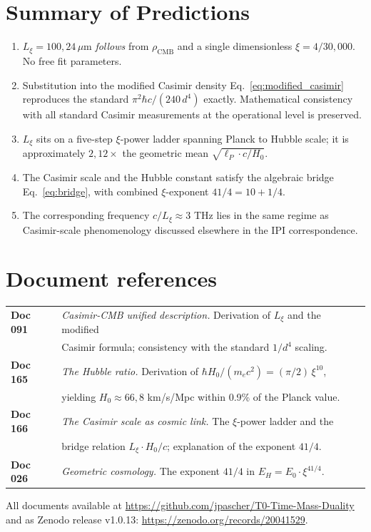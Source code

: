 \documentclass[11pt,a4paper]{article}
\begin{document}
\section{Summary of Predictions}

\begin{enumerate}\itemsep2pt
\item $L_\xi = 100{,}24\,\mu$m \emph{follows} from $\rho_{\mathrm{CMB}}$ and a single dimensionless $\xi = 4/30{,}000$. No free fit parameters.
\item Substitution into the modified Casimir density Eq.~\eqref{eq:modified_casimir} reproduces the standard $\pi^2 \hbar c/(240\,d^4)$ exactly. Mathematical consistency with all standard Casimir measurements at the operational level is preserved.
\item $L_\xi$ sits on a five-step $\xi$-power ladder spanning Planck to Hubble scale; it is approximately $2{,}12\times$ the geometric mean $\sqrt{\ell_P \cdot c/H_0}$.
\item The Casimir scale and the Hubble constant satisfy the algebraic bridge Eq.~\eqref{eq:bridge}, with combined $\xi$-exponent $41/4 = 10 + 1/4$.
\item The corresponding frequency $c/L_\xi \approx 3$ THz lies in the same regime as Casimir-scale phenomenology discussed elsewhere in the IPI correspondence.
\end{enumerate}

\section*{Document references}

\noindent\begin{tabular}{ll}
\textbf{Doc 091} & \emph{Casimir-CMB unified description.} Derivation of $L_\xi$ and the modified \\
& Casimir formula; consistency with the standard $1/d^4$ scaling. \\[2pt]
\textbf{Doc 165} & \emph{The Hubble ratio.} Derivation of $\hbar H_0 / (m_e c^2) = (\pi/2)\,\xi^{10}$, \\
& yielding $H_0 \approx 66{,}8$ km/s/Mpc within 0.9\% of the Planck value. \\[2pt]
\textbf{Doc 166} & \emph{The Casimir scale as cosmic link.} The $\xi$-power ladder and the \\
& bridge relation $L_\xi \cdot H_0/c$; explanation of the exponent $41/4$. \\[2pt]
\textbf{Doc 026} & \emph{Geometric cosmology.} The exponent $41/4$ in $E_H = E_0 \cdot \xi^{41/4}$. \\
\end{tabular}

\medskip
All documents available at \url{https://github.com/jpascher/T0-Time-Mass-Duality}\\
and as Zenodo release v1.0.13: \url{https://zenodo.org/records/20041529}.
\end{document}
